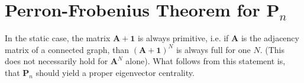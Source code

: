 \section{Perron-Frobenius Theorem for $\mathbf{P}_n$}
In the static case, the matrix $\mathbf{A}+\mathbf{1}$ is always primitive, i.e. if $\mathbf{A}$ is the adjacency matrix of a connected graph, than $(\mathbf{A}+\mathbf{1})^N$ is always full for one $N$.
(This does not necessarily hold for $\mathbf{A}^N$ alone).
What follows from this statement is, that $\mathbf{P}_n$ should yield a proper eigenvector centrality.

